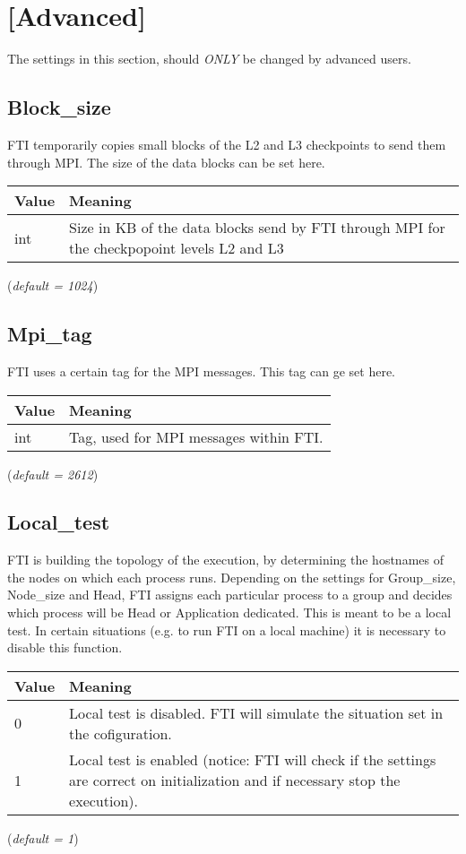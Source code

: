 \documentclass{refrep}
\begin{document}
\section{[Advanced]}\label{sec:advanced}
The settings in this section, should \emph{ONLY} be changed by advanced users.
\subsection{Block\_size}\label{subsec:blockzize}
FTI temporarily copies small blocks of the L2 and L3 checkpoints to send them through MPI. The size of the data blocks can be set here.
\begin{center}
\begin{tabular}[h!]{|p{}|p{}|}
\hline
\textbf{Value} & \textbf{Meaning} \\ \hline
int & Size in KB of the data blocks send by FTI through MPI for the checkpopoint levels L2 and L3 \\ \hline
\end{tabular}
\end{center}
(\textit{default = 1024})
\subsection{Mpi\_tag}\label{subsec:mpitag}
FTI uses a certain tag for the MPI messages. This tag can ge set here.
\begin{center}
\begin{tabular}[h!]{|p{}|p{}|}
\hline
\textbf{Value} & \textbf{Meaning} \\ \hline
int & Tag, used for MPI messages within FTI. \\ \hline
\end{tabular}
\end{center}
(\textit{default = 2612})
\subsection{Local\_test}\label{subsec:localtest}
FTI is building the topology of the execution, by determining the hostnames of the nodes on which each process runs. Depending on the settings for Group\_size, Node\_size and Head, FTI assigns each particular process to a group and decides which process will be Head or Application dedicated. This is meant to be a local test. In certain situations (e.g. to run FTI on a local machine) it is necessary to disable this function.
\begin{center}
\begin{tabular}[h!]{|p{}|p{}|}
\hline
\textbf{Value} & \textbf{Meaning} \\ \hline
0 & Local test is disabled. FTI will simulate the situation set in the cofiguration. \\ \hline
1 & Local test is enabled (notice: FTI will check if the settings are correct on initialization and if necessary stop the execution). \\ \hline
\end{tabular}
\end{center}
(\textit{default = 1})
\end{document}
